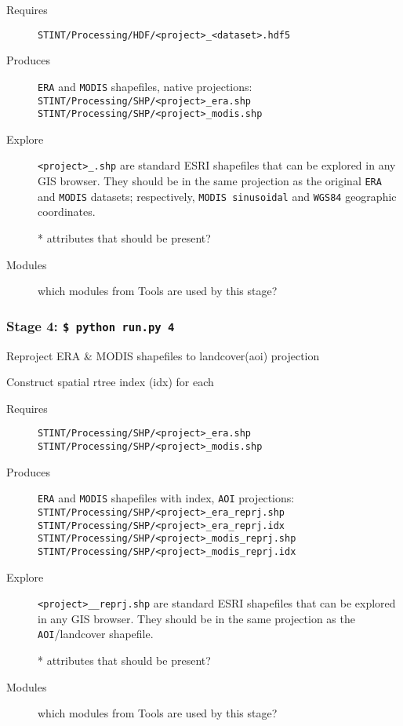 \documentclass[twoside,a4paper]{refart}
\begin{document}
  \begin{description}
    \item [Requires]
          \texttt{STINT/Processing/HDF/<project>\_<dataset>.hdf5}
  
  
    \item [Produces]
      \texttt{ERA} and \texttt{MODIS} shapefiles, native projections:\\
      \texttt{STINT/Processing/SHP/<project>\_era.shp} \\
      \texttt{STINT/Processing/SHP/<project>\_modis.shp} 
      

    \item [Explore]
      \texttt{<project>\_<modis|era>.shp} are standard ESRI shapefiles that can be explored in any GIS browser.  They should be in the same projection as the original \texttt{ERA} and \texttt{MODIS} datasets; respectively, \texttt{MODIS sinusoidal} and \texttt{WGS84} geographic coordinates.
      
      * attributes that should be present?


    \item [Modules]
      which modules from Tools are used by this stage?
  \end{description}


\subsubsection{\textbf{Stage 4:} \texttt{\$ python run.py 4}}
        Reproject ERA \& MODIS shapefiles to landcover(aoi) projection
        
       
        Construct spatial rtree index (idx) for each

  \begin{description}
    \item [Requires]
      \texttt{STINT/Processing/SHP/<project>\_era.shp}\\
      \texttt{STINT/Processing/SHP/<project>\_modis.shp}
  
    \item [Produces]
      \texttt{ERA} and \texttt{MODIS} shapefiles with index, 
      \texttt{AOI} projections:\\ 
      \texttt{STINT/Processing/SHP/<project>\_era\_reprj.shp}\\
      \texttt{STINT/Processing/SHP/<project>\_era\_reprj.idx}\\
      \texttt{STINT/Processing/SHP/<project>\_modis\_reprj.shp}\\
      \texttt{STINT/Processing/SHP/<project>\_modis\_reprj.idx}      
      

    \item [Explore]
      \texttt{<project>\_<modis|era>\_reprj.shp} are standard ESRI shapefiles that can be explored in any GIS browser.  They should be in the same projection as the \texttt{AOI}/landcover shapefile.
      
      * attributes that should be present?

    \item [Modules]
      which modules from Tools are used by this stage?
  \end{description}
\end{document}
